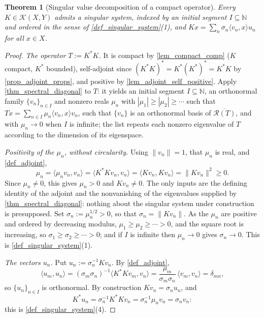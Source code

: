 \documentclass[a4paper]{report}
\theoremstyle{plain}
\newtheorem{theorem}{Theorem}[chapter]
\theoremstyle{definition}
\theoremstyle{remark}
\begin{document}
\begin{theorem}[Singular value decomposition of a compact operator]
  \label{thm_svd}
  Every $K \in \mathcal{K}(X,Y)$ admits a singular system, indexed by an initial segment
  $I \subseteq \mathbb{N}$ and \emph{ordered} in the sense of
  \cref{def_singular_system}(1), and $Kx = \sum_n \sigma_n\langle v_n,x\rangle u_n$ for
  all $x \in X$.
\end{theorem}
\begin{proof}
  \emph{The operator $T := K^*K$.}  It is compact by \cref{lem_compact_comp} ($K$ compact,
  $K^*$ bounded), self-adjoint since $(K^*K)^* = K^*(K^*)^* = K^*K$ by
  \cref{prop_adjoint_props}, and positive by \cref{lem_adjoint_self_positive}.  Apply
  \cref{thm_spectral_diagonal} to $T$: it yields an initial segment
  $I \subseteq \mathbb{N}$, an orthonormal family $\{v_n\}_{n\in I}$ and nonzero reals
  $\mu_n$ with $|\mu_1| \ge |\mu_2| \ge \cdots$ such that
  $Tx = \sum_{n\in I}\mu_n\langle v_n,x\rangle v_n$, such that $\{v_n\}$ is an orthonormal
  basis of $\overline{\mathcal{R}(T)}$, and with $\mu_n \to 0$ when $I$ is infinite; the
  list repeats each nonzero eigenvalue of $T$ according to the dimension of its
  eigenspace.

  \emph{Positivity of the $\mu_n$, without circularity.}  Using $\|v_n\| = 1$, that $\mu_n$
  is real, and \cref{def_adjoint},
  \[
    \mu_n = \langle \mu_nv_n,v_n\rangle = \langle K^*Kv_n,v_n\rangle
          = \langle Kv_n,Kv_n\rangle = \|Kv_n\|^2 \ge 0 .
  \]
  Since $\mu_n \ne 0$, this gives $\mu_n > 0$ and $Kv_n \ne 0$.  The only inputs are the
  defining identity of the adjoint and the nonvanishing of the eigenvalues supplied by
  \cref{thm_spectral_diagonal}: nothing about the singular system under construction is
  presupposed.  Set $\sigma_n := \mu_n^{1/2} > 0$, so that $\sigma_n = \|Kv_n\|$.  As the
  $\mu_n$ are positive and ordered by decreasing modulus,
  $\mu_1 \ge \mu_2 \ge \cdots > 0$, and the square root is increasing, so
  $\sigma_1 \ge \sigma_2 \ge \cdots > 0$; and if $I$ is infinite then $\mu_n \to 0$ gives
  $\sigma_n \to 0$.  This is \cref{def_singular_system}(1).

  \emph{The vectors $u_n$.}  Put $u_n := \sigma_n^{-1}Kv_n$.  By \cref{def_adjoint},
  \[
    \langle u_m,u_n\rangle
      = (\sigma_m\sigma_n)^{-1}\langle K^*Kv_m,v_n\rangle
      = \frac{\mu_m}{\sigma_m\sigma_n}\,\langle v_m,v_n\rangle = \delta_{mn},
  \]
  so $\{u_n\}_{n\in I}$ is orthonormal.  By construction $Kv_n = \sigma_nu_n$, and
  \[
    K^*u_n = \sigma_n^{-1}K^*Kv_n = \sigma_n^{-1}\mu_nv_n = \sigma_nv_n :
  \]
  this is \cref{def_singular_system}(4).


\end{proof}
\end{document}

